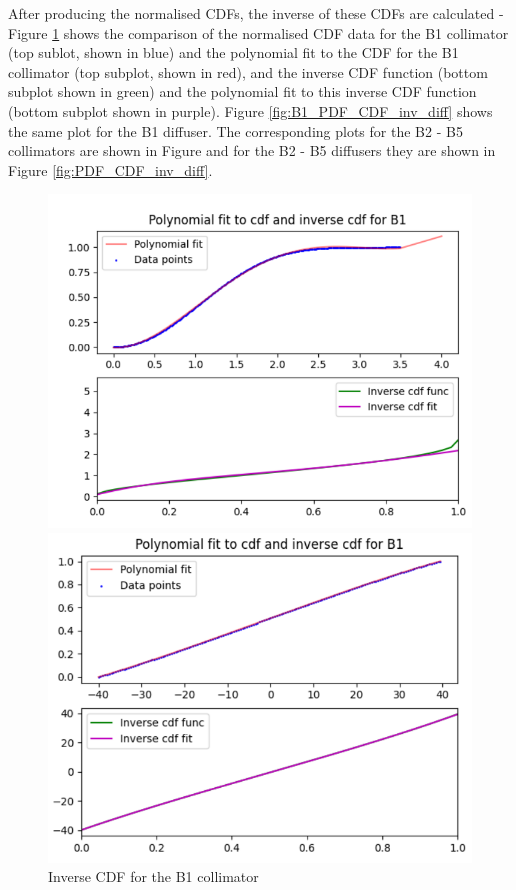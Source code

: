 After producing the normalised CDFs, the inverse of these CDFs are calculated - Figure \ref{fig:B1_PDF_CDF_inv_coll} shows the comparison of the normalised CDF data for the B1 collimator (top sublot, shown in blue) and the polynomial fit to the CDF for the B1 collimator (top subplot, shown in red), and the inverse CDF function (bottom subplot shown in green) and the polynomial fit to this inverse CDF function (bottom subplot shown in purple). Figure \ref{fig:B1_PDF_CDF_inv_diff} shows the same plot for the B1 diffuser. The corresponding plots for the B2 - B5 collimators are shown in Figure \label{fig:PDF_CDF_inv_diff} and for the B2 - B5 diffusers they are shown in Figure \ref{fig:PDF_CDF_inv_diff}.

\begin{figure}
    \centering
    \begin{minipage}{0.5\textwidth}
        \centering
        \includegraphics[width=\textwidth]{Figures/B1_inv_coll_cdf.png} %
        \caption{Inverse CDF for the B1 collimator}
        \label{fig:B1_PDF_CDF_inv_coll}
    \end{minipage}\hfill
    \begin{minipage}{0.5\textwidth}
        \centering
        \includegraphics[width=\textwidth]{Figures/B1_inv_diff_cdf.png} %

\end{minipage}
\end{figure}

